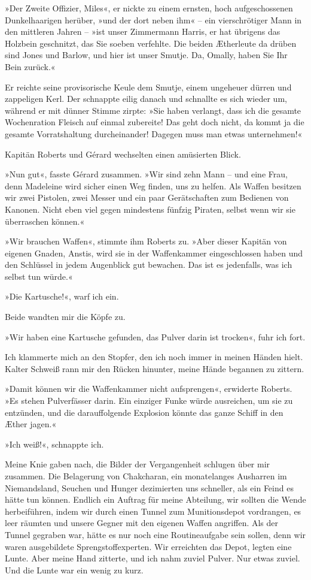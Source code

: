 »Der Zweite Offizier, Miles«, er nickte zu einem ernsten, hoch
aufgeschossenen Dunkelhaarigen herüber, »und der dort neben ihm« –
ein vierschrötiger Mann in den mittleren Jahren – »ist unser
Zimmermann Harris, er hat übrigens das Holzbein geschnitzt, das Sie
soeben verfehlte. Die beiden Ætherleute da drüben sind Jones und
Barlow, und hier ist unser Smutje. Da, Omally, haben Sie Ihr Bein
zurück.«

Er reichte seine provisorische Keule dem Smutje, einem ungeheuer
dürren und zappeligen Kerl. Der schnappte eilig danach und
schnallte es sich wieder um, während er mit dünner Stimme zirpte:
»Sie haben verlangt, dass ich die gesamte Wochenration Fleisch auf
einmal zubereite! Das geht doch nicht, da kommt ja die gesamte
Vorratshaltung durcheinander! Dagegen muss man etwas unternehmen!«

Kapitän Roberts und Gérard wechselten einen amüsierten Blick.

»Nun gut«, fasste Gérard zusammen. »Wir sind zehn Mann – und eine
Frau, denn Madeleine wird sicher einen Weg finden, uns zu helfen.
Als Waffen besitzen wir zwei Pistolen, zwei Messer und ein paar
Gerätschaften zum Bedienen von Kanonen. Nicht eben viel gegen
mindestens fünfzig Piraten, selbst wenn wir sie überraschen
können.«

»Wir brauchen Waffen«, stimmte ihm Roberts zu. »Aber dieser Kapitän
von eigenen Gnaden, Anstis, wird sie in der Waffenkammer
eingeschlossen haben und den Schlüssel in jedem Augenblick gut
bewachen. Das ist es jedenfalls, was ich selbst tun würde.«

»Die Kartusche!«, warf ich ein.

Beide wandten mir die Köpfe zu.

»Wir haben eine Kartusche gefunden, das Pulver darin ist trocken«,
fuhr ich fort.

Ich klammerte mich an den Stopfer, den ich noch immer in meinen
Händen hielt. Kalter Schweiß rann mir den Rücken hinunter, meine
Hände begannen zu zittern.

»Damit können wir die Waffenkammer nicht aufsprengen«, erwiderte
Roberts. »Es stehen Pulverfässer darin. Ein einziger Funke würde
ausreichen, um sie zu entzünden, und die darauffolgende Explosion
könnte das ganze Schiff in den Æther jagen.«

»Ich weiß!«, schnappte ich.

\bigpar

Meine Knie gaben nach, die Bilder der Vergangenheit schlugen über
mir zusammen. Die Belagerung von Chakcharan, ein monatelanges
Ausharren im Niemandsland, Seuchen und Hunger dezimierten uns
schneller, als ein Feind es hätte tun können. Endlich ein Auftrag
für meine Abteilung, wir sollten die Wende herbeiführen, indem wir
durch einen Tunnel zum Munitionsdepot vordrangen, es leer räumten
und unsere Gegner mit den eigenen Waffen angriffen. Als der Tunnel
gegraben war, hätte es nur noch eine Routineaufgabe sein sollen,
denn wir waren ausgebildete Sprengstoffexperten. Wir erreichten das
Depot, legten eine Lunte. Aber meine Hand zitterte, und ich nahm
zuviel Pulver. Nur etwas zuviel. Und die Lunte war ein wenig zu
kurz.

